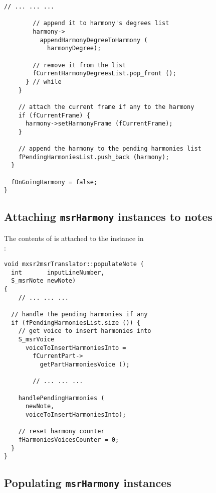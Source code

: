 \begin{lstlisting}[language=CPlusPlus]
				// ... ... ...

        // append it to harmony's degrees list
        harmony->
          appendHarmonyDegreeToHarmony (
            harmonyDegree);

        // remove it from the list
        fCurrentHarmonyDegreesList.pop_front ();
      } // while
    }

    // attach the current frame if any to the harmony
    if (fCurrentFrame) {
      harmony->setHarmonyFrame (fCurrentFrame);
    }

    // append the harmony to the pending harmonies list
    fPendingHarmoniesList.push_back (harmony);
  }

  fOnGoingHarmony = false;
}
\end{lstlisting}


\subsection{Attaching {\tt msrHarmony} instances to notes}

The contents of  is attached to the  instance in\\
:
\begin{lstlisting}[language=CPlusPlus]
void mxsr2msrTranslator::populateNote (
  int       inputLineNumber,
  S_msrNote newNote)
{
	// ... ... ...

  // handle the pending harmonies if any
  if (fPendingHarmoniesList.size ()) {
    // get voice to insert harmonies into
    S_msrVoice
      voiceToInsertHarmoniesInto =
        fCurrentPart->
          getPartHarmoniesVoice ();

		// ... ... ...

    handlePendingHarmonies (
      newNote,
      voiceToInsertHarmoniesInto);

    // reset harmony counter
    fHarmoniesVoicesCounter = 0;
  }
}
\end{lstlisting}


\subsection{Populating {\tt msrHarmony} instances}

